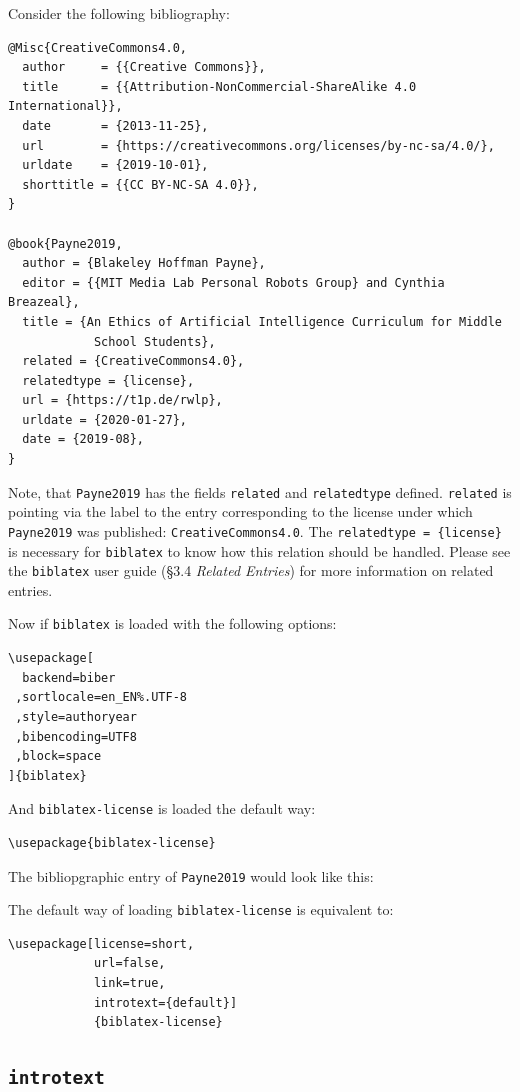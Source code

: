 \documentclass[11pt,oneside,notitlepage,a4paper,english,parskip=half*] {scrartcl}
\begin{document}
Consider the following bibliography:
\begin{verbatim}
@Misc{CreativeCommons4.0,
  author     = {{Creative Commons}},
  title      = {{Attribution-NonCommercial-ShareAlike 4.0 International}},
  date       = {2013-11-25},
  url        = {https://creativecommons.org/licenses/by-nc-sa/4.0/},
  urldate    = {2019-10-01},
  shorttitle = {{CC BY-NC-SA 4.0}},
}

@book{Payne2019,
  author = {Blakeley Hoffman Payne},
  editor = {{MIT Media Lab Personal Robots Group} and Cynthia Breazeal},
  title = {An Ethics of Artificial Intelligence Curriculum for Middle
            School Students},
  related = {CreativeCommons4.0},
  relatedtype = {license},
  url = {https://t1p.de/rwlp},
  urldate = {2020-01-27},
  date = {2019-08},
}
\end{verbatim}
Note, that \texttt{Payne2019} has the fields \texttt{related} and \texttt{relatedtype} defined. \texttt{related} is pointing via the label to the entry corresponding to the license under which \texttt{Payne2019} was published: \texttt{CreativeCommons4.0}. The \texttt{relatedtype = \{license\}} is necessary for \texttt{biblatex} to know how this relation should be handled. Please see the \texttt{biblatex} user guide (§3.4 \emph{Related Entries}) for more information on related entries.

Now if \texttt{biblatex} is loaded with the following options:
\begin{verbatim}
\usepackage[
  backend=biber
 ,sortlocale=en_EN%.UTF-8
 ,style=authoryear
 ,bibencoding=UTF8 
 ,block=space
]{biblatex}
\end{verbatim}

And \texttt{biblatex-license} is loaded the default way:
\begin{verbatim}
\usepackage{biblatex-license}
\end{verbatim}

The bibliopgraphic entry of \texttt{Payne2019} would look like this:
\nocite{Payne2019}\printbibliography[heading=none]

The default way of loading \texttt{biblatex-license} is equivalent to:
\begin{verbatim}
\usepackage[license=short,
            url=false,
            link=true,
            introtext={default}]
            {biblatex-license}
\end{verbatim}

\subsection{\texttt{introtext}}
\end{document}
